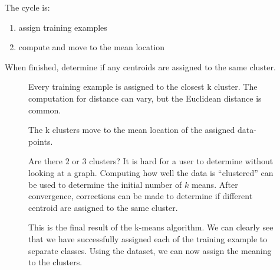 \documentclass[11pt]{article}
\begin{document}
The cycle is:
\begin{enumerate}
 \item assign training examples
 \item compute and move to the mean location 
\end{enumerate}
When finished, determine if any centroids are assigned to the same cluster.


\begin{minipage}{0.47\linewidth}
  \begin{figure}[H]
    \centering
    
    \caption{Every training example is assigned to the closest k cluster. The computation for distance can vary, but the Euclidean distance is common.}
    \label{fig:kmeans_assignment}
  \end{figure}
\end{minipage}\hfill
\begin{minipage}{0.47\linewidth}
  \begin{figure}[H]
    \centering
    
    \caption{The k clusters move to the mean location of the assigned data-points.}
    \label{fig:kmeans_move}
  \end{figure}
\end{minipage}\vspace{0.5cm}

\begin{minipage}{0.47\linewidth}
  \begin{figure}[H]
    \centering
    
    \caption{Are there $2$ or $3$ clusters? It is hard for a user to determine without looking at a graph. Computing how well the data is ``clustered'' can be used to determine the initial number of $k$ means. After convergence, corrections can be made to determine if different centroid are assigned to the same cluster.}
    \label{fig:kmeans_2or3}
  \end{figure}
\end{minipage}\hfill
\begin{minipage}{0.47\linewidth}
  \begin{figure}[H]
    \centering
    
    \caption{This is the final result of the k-means algorithm. We can clearly see that we have successfully assigned each of the training example to separate classes. Using the dataset, we can now assign the meaning to the clusters.}
    \label{fig:kmeans_final}
  \end{figure}
\end{minipage}\vspace{0.5cm}
\end{document}
